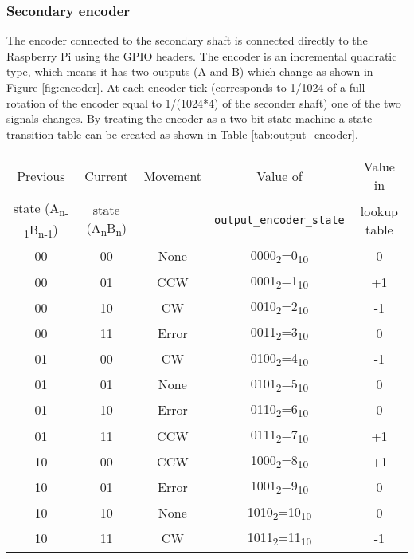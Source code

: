 \documentclass[12pt]{article}
\begin{document}
\subsubsection{Secondary encoder}
The encoder connected to the secondary shaft is connected directly to the Raspberry Pi using the GPIO headers. The encoder is an incremental quadratic type, which means it has two outputs (A and B) which change as shown in Figure \ref{fig:encoder}. At each encoder tick (corresponds to 1/1024 of a full rotation of the encoder equal to 1/(1024*4) of the seconder shaft) one of the two signals changes. By treating the encoder as a two bit state machine a state transition table can be created as shown in Table \ref{tab:output_encoder}.
\begin{table}[h]
    \centering
    \begin{tabular}{|c|c|c|c|c|}
    \hline
        Previous  & Current  & Movement&Value of & Value in \\
        state (A\textsubscript{n-1}B\textsubscript{n-1}) & state (A\textsubscript{n}B\textsubscript{n})&&\verb|output_encoder_state|& lookup table\\%
        \hline
         00&00&None&0000\textsubscript{2}=0\textsubscript{10}&0\\ 
         00&01&CCW&0001\textsubscript{2}=1\textsubscript{10}&+1\\ 
         00&10&CW&0010\textsubscript{2}=2\textsubscript{10}&-1\\ 
         00&11&Error&0011\textsubscript{2}=3\textsubscript{10}&0\\ 
         
         01&00&CW&0100\textsubscript{2}=4\textsubscript{10}&-1\\ 
         01&01&None&0101\textsubscript{2}=5\textsubscript{10}&0\\ 
         01&10&Error&0110\textsubscript{2}=6\textsubscript{10}&0\\ 
         01&11&CCW&0111\textsubscript{2}=7\textsubscript{10}&+1\\ 
         
         10&00&CCW&1000\textsubscript{2}=8\textsubscript{10}&+1\\ 
         10&01&Error&1001\textsubscript{2}=9\textsubscript{10}&0\\ 
         10&10&None&1010\textsubscript{2}=10\textsubscript{10}&0\\ 
         10&11&CW&1011\textsubscript{2}=11\textsubscript{10}&-1\\ 
         

\end{tabular}
\end{table}
\end{document}
